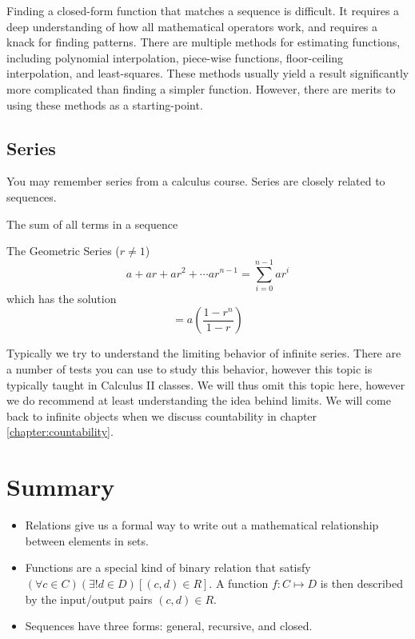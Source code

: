 \documentclass[main.tex]{subfiles}
\begin{document}
Finding a closed-form function that matches a sequence is difficult. It requires a deep understanding of how all mathematical operators work, and requires a knack for finding patterns. There are multiple methods for estimating functions, including polynomial interpolation, piece-wise functions, floor-ceiling interpolation, and least-squares. These methods usually yield a result significantly more complicated than finding a simpler function. However, there are merits to using these methods as a starting-point.

\subsection{Series}

You may remember series from a calculus course. Series are closely related to sequences.

\begin{defn}
	The sum of all terms in a sequence
\end{defn}

\begin{example}
	The Geometric Series (\(r \neq 1\)) \[a + ar + ar^2 + \cdots ar^{n-1} = \sum_{i=0}^{n-1} ar^i\]
	which has the solution \[= a(\frac{1-r^n}{1-r})\]
\end{example}

Typically we try to understand the limiting behavior of infinite series. There are a number of tests you can use to study this behavior, however this topic is typically taught in Calculus II classes. We will thus omit this topic here, however we do recommend at least understanding the idea behind limits. We will come back to infinite objects when we discuss countability in chapter \ref{chapter:countability}.


\section{Summary}

\begin{itemize}
	\item Relations give us a formal way to write out a mathematical relationship between elements in sets.
	\item Functions are a special kind of binary relation that satisfy \((\forall c \in C)(\exists! d \in D)[(c,d) \in R]\). A function \(f : C \mapsto D\) is then described by the input/output pairs \((c,d) \in R\).
	\item Sequences have three forms: general, recursive, and closed.
\end{itemize}
\end{document}
